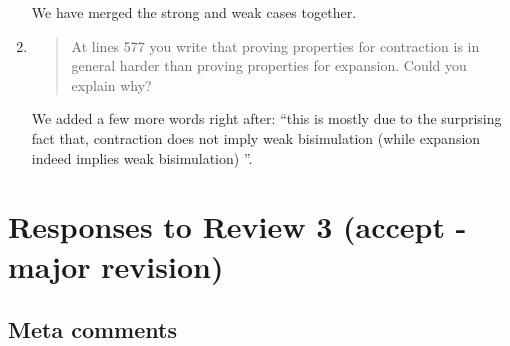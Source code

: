\begin{enumerate}
  We have merged the strong and weak cases together.
  
\item \begin{quote}
    At lines 577 you write that proving properties for contraction is
    in general harder than proving properties for expansion. Could you
    explain why?
  \end{quote}

  We added a few more words right after: ``this is mostly due to the surprising fact
that, contraction does not imply weak bisimulation (while expansion
indeed implies weak bisimulation) ''.

\end{enumerate}

\section*{Responses to Review 3 (accept - major revision)}

\subsection*{Meta comments}

